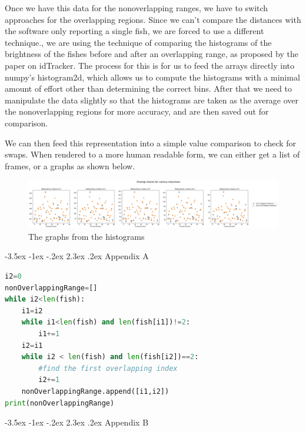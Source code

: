 \documentclass{article}
\makeatletter
\renewcommand\section{\clearpage\newpage\@startsection {section}{1}{\z@}%
	{-3.5ex \@plus -1ex \@minus -.2ex}%
	{2.3ex \@plus.2ex}%
	{\normalfont\Large\bfseries}}
\makeatother
\begin{document}
Once we have this data for the nonoverlapping ranges, we have to switch approaches for the overlapping regions. Since we can't compare the distances with the software only reporting a single fish, we are forced to use a different technique., we are using the technique of comparing the histograms of the brightness of the fishes before and after an overlapping range, as proposed by the paper on idTracker\cite{perez-escudero_idtracker_2014}. The process for this is for us to feed the arrays directly into numpy's histogram2d, which allows us to compute the histograms with a minimal amount of effort other than determining the correct bins. After that we need to manipulate the data slightly so that the histograms are taken as the average over the nonoverlapping regions for more accuracy, and are then saved out for comparison.

We can then feed this representation into a simple value comparison to check for swaps. When rendered to a more human readable form, we can either get a list of frames, or a graphs as shown below.

\begin{figure}[H]
	\centering
	\includegraphics[width=\linewidth]{reducedGraph}
	\caption{The graphs from the histograms}
	\label{fig:reducedGraph}
\end{figure}


\appendix
\section{Appendix A}
\label{appendix1}

\begin{minipage}[c]{\textwidth}
\begin{lstlisting}[language=Python]
i2=0
nonOverlappingRange=[]
while i2<len(fish):
    i1=i2
    while i1<len(fish) and len(fish[i1])!=2:
        i1+=1
    i2=i1
    while i2 < len(fish) and len(fish[i2])==2:
        #find the first overlapping index
        i2+=1
    nonOverlappingRange.append([i1,i2])
print(nonOverlappingRange)
\end{lstlisting}
\end{minipage}

\section{Appendix B}
\label{app:swapStatus}
\end{document}
